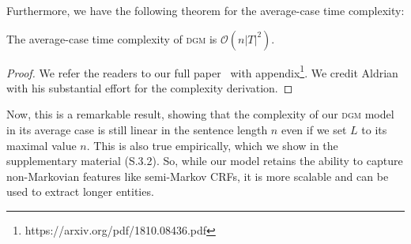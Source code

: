 Furthermore, we have the following theorem for the average-case time complexity:
\begin{theorem}
	The average-case time complexity of \textsc{dgm} is $\mathcal{O}(n|T|^2)$.
\end{theorem}
\begin{proof}
	
	We refer the readers to our full paper~\cite{jie2017efficient} with appendix\footnote{https://arxiv.org/pdf/1810.08436.pdf}.
	We credit Aldrian with his substantial effort for the complexity derivation.
\end{proof}


Now, this is a remarkable result, showing that the  complexity of our \textsc{dgm} model in its average case is still linear in the sentence length $n$ even if we set $L$ to its maximal value $n$. This is also true empirically, which we show in the supplementary material (S.3.2).
So, while our model retains the ability to capture non-Markovian features like semi-Markov CRFs,
it is more scalable and can be used to extract longer entities.

%


